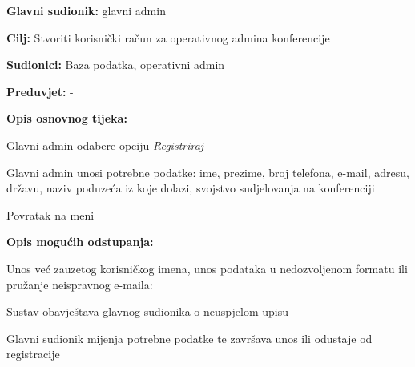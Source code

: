      				 \noindent {}
					\begin{packed_item}
	
						\item \textbf{Glavni sudionik: }glavni admin
						\item  \textbf{Cilj:} Stvoriti korisnički račun za  operativnog admina konferencije
						\item  \textbf{Sudionici:} Baza podatka, operativni admin
						\item  \textbf{Preduvjet:} -
						\item  \textbf{Opis osnovnog tijeka:}
						
						\item[] \begin{packed_enum}

							\item Glavni admin odabere opciju \textit{Registriraj}
							\item Glavni admin unosi potrebne podatke: ime, prezime, broj telefona, e-mail, adresu, državu, naziv poduzeća iz koje dolazi, svojstvo sudjelovanja na konferenciji
                                \item Povratak na meni
						
						\end{packed_enum}
						\item  \textbf{Opis mogućih odstupanja:}
						
						\item[] \begin{packed_item}

                                    \item[1.]  Unos već zauzetog korisničkog imena, unos podataka u nedozvoljenom       formatu ili pružanje neispravnog e-maila:
							\item[] \begin{packed_enum}
								
								\item Sustav obavještava glavnog sudionika o neuspjelom upisu
								\item Glavni sudionik mijenja potrebne podatke te završava unos ili odustaje od registracije
							
						\end{packed_enum}
					\end{packed_item}
     \end{packed_item}

